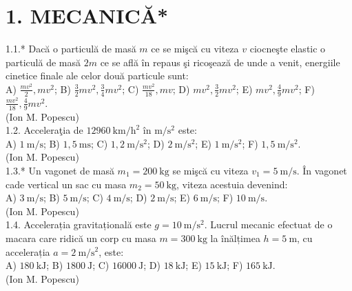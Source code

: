
\section*{1. MECANICĂ*}


1.1.* Dacă o particulă de masă $m$ ce se mişcă cu viteza $v$ ciocneşte elastic o particulă de masă $2 m$ ce se află în repaus şi ricoşează de unde a venit, energiile cinetice finale ale celor două particule sunt:\\ A) $\frac{m v^{2}}{2}, m v^{2}$; B) $\frac{3}{2} m v^{2}, \frac{3}{4} m v^{2}$; C) $\frac{m v^{2}}{18}, m v$; D) $m v^{2}, \frac{3}{2} m v^{2}$; E) $m v^{2}, \frac{4}{9} m v^{2}$; F) $\frac{m v^{2}}{18}, \frac{4}{9} m v^{2}$.\\ (Ion M. Popescu)\\

1.2. Acceleraţia de $12960 \mathrm{~km} / \mathrm{h}^{2}$ în $\mathrm{m} / \mathrm{s}^{2}$ este:\\ A) $1 \mathrm{~m} / \mathrm{s}$; B) $1,5 \mathrm{~ms}$; C) $1,2 \mathrm{~m} / \mathrm{s}^{2}$; D) $2 \mathrm{~m} / \mathrm{s}^{2}$; E) $1 \mathrm{~m} / \mathrm{s}^{2}$; F) $1,5 \mathrm{~m} / \mathrm{s}^{2}$.\\ (Ion M. Popescu)\\

1.3.* Un vagonet de masă $m_{1}=200 \mathrm{~kg}$ se mişcă cu viteza $v_{1}=5 \mathrm{~m} / \mathrm{s}$. În vagonet cade vertical un sac cu masa $m_{2}=50 \mathrm{~kg}$, viteza acestuia devenind:\\ A) $3 \mathrm{~m} / \mathrm{s}$; B) $5 \mathrm{~m} / \mathrm{s}$; C) $4 \mathrm{~m} / \mathrm{s}$; D) $2 \mathrm{~m} / \mathrm{s}$; E) $6 \mathrm{~m} / \mathrm{s}$; F) $10 \mathrm{~m} / \mathrm{s}$.\\ (Ion M. Popescu)\\

1.4. Accelerația gravitațională este $g=10 \mathrm{~m} / \mathrm{s}^{2}$. Lucrul mecanic efectuat de o macara care ridică un corp cu masa $m=300 \mathrm{~kg}$ la înălțimea $h=5 \mathrm{~m}$, cu accelerația $a=2 \mathrm{~m} / \mathrm{s}^{2}$, este:\\ A) $180 \mathrm{~kJ}$; B) $1800 \mathrm{~J}$; C) $16000 \mathrm{~J}$; D) $18 \mathrm{~kJ}$; E) $15 \mathrm{~kJ}$; F) $165 \mathrm{~kJ}$.\\ (Ion M. Popescu)\\

